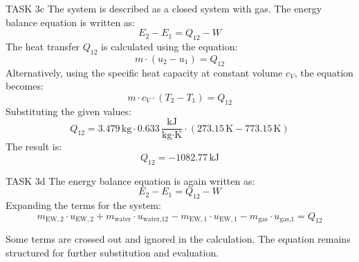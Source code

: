 TASK 3c  
The system is described as a closed system with gas. The energy balance equation is written as:  
\[
E_2 - E_1 = Q_{12} - W
\]  
The heat transfer \( Q_{12} \) is calculated using the equation:  
\[
m \cdot (u_2 - u_1) = Q_{12}
\]  
Alternatively, using the specific heat capacity at constant volume \( c_V \), the equation becomes:  
\[
m \cdot c_V \cdot (T_2 - T_1) = Q_{12}
\]  
Substituting the given values:  
\[
Q_{12} = 3.479 \, \text{kg} \cdot 0.633 \, \frac{\text{kJ}}{\text{kg·K}} \cdot (273.15 \, \text{K} - 773.15 \, \text{K})
\]  
The result is:  
\[
Q_{12} = -1082.77 \, \text{kJ}
\]  

TASK 3d  
The energy balance equation is again written as:  
\[
E_2 - E_1 = Q_{12} - W
\]  
Expanding the terms for the system:  
\[
m_{\text{EW},2} \cdot u_{\text{EW},2} + m_{\text{water}} \cdot u_{\text{water,12}} - m_{\text{EW},1} \cdot u_{\text{EW},1} - m_{\text{gas}} \cdot u_{\text{gas,1}} = Q_{12}
\]  

Some terms are crossed out and ignored in the calculation. The equation remains structured for further substitution and evaluation.
